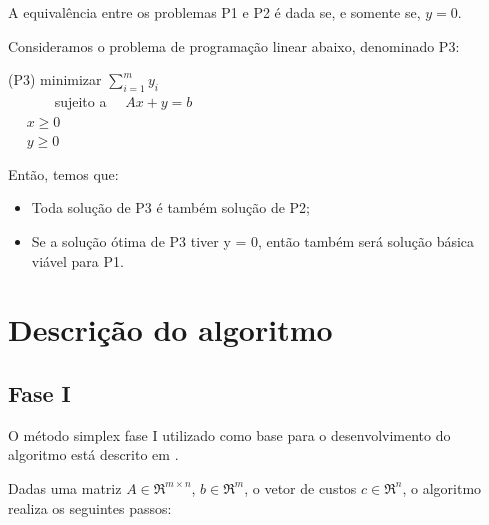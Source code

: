 \documentclass[
	12pt,				%
	openright,			%
	oneside,			%
	a4paper,			%
	english,			%
	french,				%
	spanish,			%
	brazil,				%
	]{abntex2}
\begin{document}
A equivalência entre os problemas P1 e P2 é dada se, e somente se, $y = 0$.

Consideramos o problema de programação linear abaixo, denominado P3:

(P3)
\indent minimizar $ \sum_{i=1}^m y_i $\\ 
\indent\indent ~~~~~~ sujeito a~~ $ Ax + y = b $\\
\indent\indent\indent\indent ~~ $x \geq 0$\\
\indent\indent\indent\indent ~~ $y \geq 0$

Então, temos que:
\begin{itemize}
\item Toda solução de P3 é também solução de P2;
\item Se a solução ótima de P3 tiver y = 0, então também será solução básica viável para P1.
\end{itemize}
\chapter{Descrição do algoritmo}
\section{Fase I}
O método simplex fase I utilizado como base para o desenvolvimento do algoritmo está descrito em
  . 
  
Dadas uma matriz $A \in \Re ^{m \times n}$, $b \in \Re ^m$, o vetor de custos $c \in\Re ^n$, o algoritmo realiza os seguintes passos:
\end{document}
